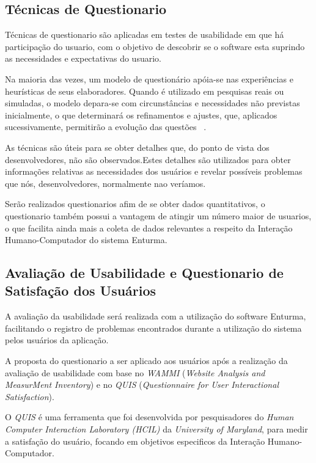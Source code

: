 \subsection{Técnicas de Questionario}
	Técnicas de questionario são aplicadas em testes de usabilidade em que há participação do usuario, com o objetivo de descobrir se o software esta suprindo as necessidades e expectativas do usuario.

	Na maioria das vezes, um modelo de questionário apóia-se nas experiências e
	heurísticas de seus elaboradores. Quando é utilizado em pesquisas reais ou simuladas, o
	modelo depara-se com circunstâncias e necessidades não previstas inicialmente, o que
	determinará os refinamentos e ajustes, que, aplicados sucessivamente, permitirão a
	evolução das questões ~\cite{usabilidade_web}. 
	
	As técnicas são úteis para se obter detalhes que, do ponto de vista dos desenvolvedores, não são observados.Estes detalhes são utilizados para obter informações relativas as necessidades dos usuários e revelar possíveis problemas que nós, desenvolvedores, normalmente nao veríamos.
	
	Serão realizados questionarios afim de se obter dados quantitativos, o questionario também possui a vantagem de atingir um número maior de usuarios, o que facilita ainda mais a coleta de dados relevantes a respeito da Interação Humano-Computador do sistema Enturma.
	
	


\subsection{Avaliação de Usabilidade e Questionario de Satisfação dos Usuários}

	A avaliação da usabilidade será realizada com a utilização do software Enturma, facilitando o registro de problemas encontrados durante a utilização do sistema pelos usuários da aplicação.
	
	A proposta do questionario a ser aplicado aos usuários após a realização da avaliação de usabilidade com base no \textit{WAMMI} (\textit{Website Analysis and MeasurMent Inventory}) e no \textit{QUIS} (\textit{Questionnaire for User Interactional Satisfaction}).


	O \textit{QUIS} é uma ferramenta que foi desenvolvida por pesquisadores do \textit{Human Computer Interaction Laboratory (HCIL)} da \textit{University of Maryland}, para medir a satisfação do usuário, focando em objetivos especificos da Interação Humano-Computador.
	
